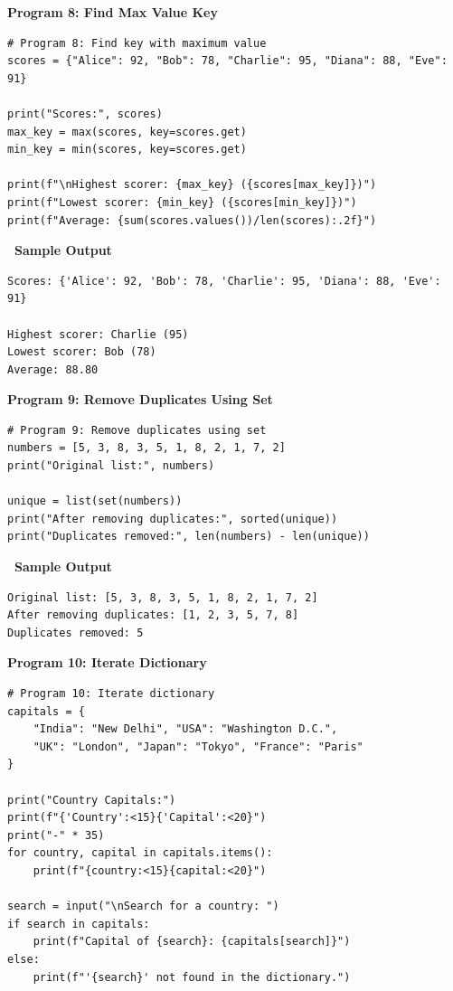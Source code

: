 \documentclass[12pt,a4paper]{article}
\newcommand{\outhead}{\noindent\colorbox{cmrgreen!25}%
  {\textbf{\small\color{cmrdark}~Sample Output~}}\par\vspace{-1pt}}
\begin{document}
\vspace{0.5cm}

\textbf{Program 8: Find Max Value Key}

\begin{lstlisting}
# Program 8: Find key with maximum value
scores = {"Alice": 92, "Bob": 78, "Charlie": 95, "Diana": 88, "Eve": 91}

print("Scores:", scores)
max_key = max(scores, key=scores.get)
min_key = min(scores, key=scores.get)

print(f"\nHighest scorer: {max_key} ({scores[max_key]})")
print(f"Lowest scorer: {min_key} ({scores[min_key]})")
print(f"Average: {sum(scores.values())/len(scores):.2f}")
\end{lstlisting}

\outhead
\begin{lstlisting}[style=outputstyle]
Scores: {'Alice': 92, 'Bob': 78, 'Charlie': 95, 'Diana': 88, 'Eve': 91}

Highest scorer: Charlie (95)
Lowest scorer: Bob (78)
Average: 88.80
\end{lstlisting}

\vspace{0.5cm}

\textbf{Program 9: Remove Duplicates Using Set}

\begin{lstlisting}
# Program 9: Remove duplicates using set
numbers = [5, 3, 8, 3, 5, 1, 8, 2, 1, 7, 2]
print("Original list:", numbers)

unique = list(set(numbers))
print("After removing duplicates:", sorted(unique))
print("Duplicates removed:", len(numbers) - len(unique))
\end{lstlisting}

\outhead
\begin{lstlisting}[style=outputstyle]
Original list: [5, 3, 8, 3, 5, 1, 8, 2, 1, 7, 2]
After removing duplicates: [1, 2, 3, 5, 7, 8]
Duplicates removed: 5
\end{lstlisting}

\vspace{0.5cm}

\textbf{Program 10: Iterate Dictionary}

\begin{lstlisting}
# Program 10: Iterate dictionary
capitals = {
    "India": "New Delhi", "USA": "Washington D.C.",
    "UK": "London", "Japan": "Tokyo", "France": "Paris"
}

print("Country Capitals:")
print(f"{'Country':<15}{'Capital':<20}")
print("-" * 35)
for country, capital in capitals.items():
    print(f"{country:<15}{capital:<20}")

search = input("\nSearch for a country: ")
if search in capitals:
    print(f"Capital of {search}: {capitals[search]}")
else:
    print(f"'{search}' not found in the dictionary.")
\end{lstlisting}
\end{document}

